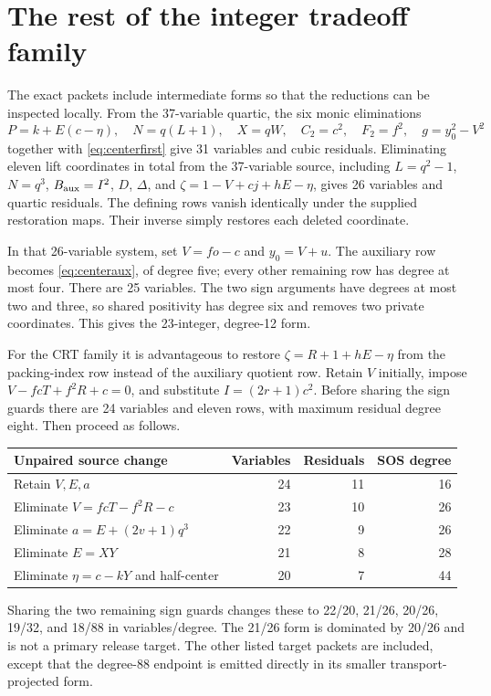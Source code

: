 \documentclass[11pt]{article}
\theoremstyle{remark}\newtheorem{remark}[theorem]{Remark}
\begin{document}
\section{The rest of the integer tradeoff family}
\label{sec:family}

The exact packets include intermediate forms so that the reductions can
be inspected locally. From the 37-variable quartic, the six monic
eliminations
\[
 P=k+E(c-\eta),\quad N=q(L+1),\quad X=qW,\quad
 C_2=c^2,\quad F_2=f^2,\quad g=y_0^2-V^2
\]
together with \eqref{eq:centerfirst} give 31 variables and cubic
residuals. Eliminating eleven lift coordinates in total from the
37-variable source, including
$L=q^2-1$, $N=q^3$, $B_{\rm aux}=I^2$, $D$, $\Delta$, and
$\zeta=1-V+cj+hE-\eta$, gives 26 variables and quartic residuals.
The defining rows vanish identically under the supplied restoration
maps. Their inverse simply restores each deleted coordinate.

In that 26-variable system, set $V=fo-c$ and $y_0=V+u$.
The auxiliary row becomes \eqref{eq:centeraux}, of degree five;
every other remaining row has degree at most four. There are 25
variables. The two sign arguments have degrees at most two and three,
so shared positivity has degree six and removes two private coordinates.
This gives the 23-integer, degree-12 form.

For the CRT family it is advantageous to restore
$\zeta=R+1+hE-\eta$ from the packing-index row instead of the
auxiliary quotient row. Retain $V$ initially, impose
$V-fcT+f^2R+c=0$, and substitute $I=(2r+1)c^2$.
Before sharing the sign guards there are 24 variables and eleven rows,
with maximum residual degree eight. Then proceed as follows.
\begin{center}
\begin{tabular}{lrrr}
\toprule
Unpaired source change & Variables & Residuals & SOS degree\\
\midrule
Retain $V,E,a$ & 24 & 11 & 16\\
Eliminate $V=fcT-f^2R-c$ & 23 & 10 & 26\\
Eliminate $a=E+(2v+1)q^3$ & 22 & 9 & 26\\
Eliminate $E=XY$ & 21 & 8 & 28\\
Eliminate $\eta=c-kY$ and half-center & 20 & 7 & 44\\
\bottomrule
\end{tabular}
\end{center}
Sharing the two remaining sign guards changes these to 22/20, 21/26,
20/26, 19/32, and 18/88 in variables/degree. The 21/26 form is dominated
by 20/26 and is not a primary release target. The other listed target
packets are included, except that the degree-88 endpoint is emitted
directly in its smaller transport-projected form.
\end{document}

